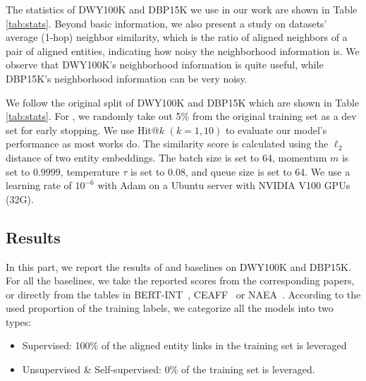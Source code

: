 The statistics of DWY100K and DBP15K we use in our work are shown in Table \ref{tab:stats}. 
Beyond basic information, we also present a study on datasets' average (1-hop) neighbor similarity, which is the ratio of aligned neighbors of a pair of aligned entities, indicating how noisy the neighborhood information is.
We observe that DWY100K's neighborhood information is quite useful, while DBP15K's neighborhood information can be very noisy.

We follow the original split of DWY100K \cite{sun2018bootstrapping} and DBP15K \cite{JAPE} which are shown in Table \ref{tab:stats}. 
For \solution, we randomly take out 5\% from the original training set as a dev set for early stopping. 
We use Hit@$k$ $(k=1, 10)$ to evaluate our model's performance as most works do. 
The similarity score is calculated using the $\ell_2$ distance of two entity embeddings. The batch size is set to 64, momentum $m$ is set to $0.9999$, temperature $\tau$ is set to $0.08$, and queue size is set to 64. We use a learning rate of $10^{-6}$ with Adam on a Ubuntu server with NVIDIA V100 GPUs (32G).







\subsection{Results}

In this part, we report the results of \solution and baselines on DWY100K and DBP15K. For all the baselines, we take the reported scores from the corresponding papers, or directly from the tables in BERT-INT~\cite{tang2019bert-int}, CEAFF~\cite{CEAFF} or NAEA~\cite{zhu2019neighborhood}. According to the used proportion of the training labels, we categorize all the models into two types:
\begin{itemize}
    \item Supervised: 100\% of the aligned entity links in the training set is leveraged
    \item Unsupervised \& Self-supervised: 0\% of the training set is leveraged.
\end{itemize}


